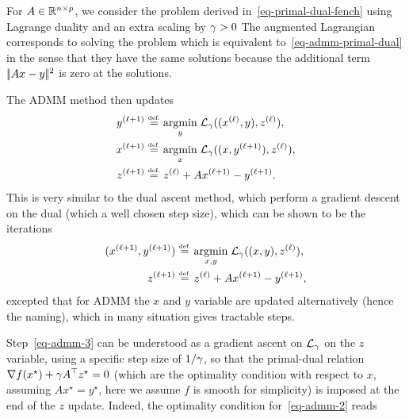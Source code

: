 For $A \in \mathbb{R}^{n \times p}$, we consider the problem derived in~\eqref{eq-primal-dual-fench} using Lagrange duality and an extra scaling by $\gamma>0$ 
The augmented Lagrangian corresponds to solving the problem
which is equivalent to~\eqref{eq-admm-primal-dual} in the sense that they have the same solutions because the additional term $|\!| Ax-y |\!|^2$ is zero at the solutions.

The ADMM method then updates
\begin{align}
	\label{eq-admm-1}y^{(\ell+1)} &\stackrel{\mbox{\upshape\tiny def.}}{=} \underset{y}{\operatorname{argmin}}\; \mathcal{L}_\gamma( (x^{(\ell)},y),z^{(\ell)}  ), \\
	\label{eq-admm-2}x^{(\ell+1)} &\stackrel{\mbox{\upshape\tiny def.}}{=} \underset{x}{\operatorname{argmin}}\; \mathcal{L}_\gamma( (x,y^{(\ell+1)}),z^{(\ell)}  ), \\
	\label{eq-admm-3}z^{(\ell+1)} &\stackrel{\mbox{\upshape\tiny def.}}{=} z^{(\ell)} + A x^{(\ell+1)}-y^{(\ell+1)}. 
\end{align}
This is very similar to the dual ascent method, which perform a gradient descent on the dual (which a well chosen step size), which can be shown to be the iterations
\begin{align*}
	(x^{(\ell+1)},y^{(\ell+1)}) &\stackrel{\mbox{\upshape\tiny def.}}{=} \underset{x,y}{\operatorname{argmin}}\; \mathcal{L}_\gamma( (x,y),z^{(\ell)}  ), \\
	z^{(\ell+1)} &\stackrel{\mbox{\upshape\tiny def.}}{=} z^{(\ell)} + A x^{(\ell+1)}-y^{(\ell+1)}, 
\end{align*}
excepted that for ADMM the $x$ and $y$ variable are updated alternatively (hence the naming), which in many situation gives tractable steps. 

Step~\eqref{eq-admm-3} can be understood as a gradient ascent on $\mathcal{L}_\gamma$ on the $z$ variable, using a specific step size of $1/\gamma$, so that the primal-dual relation $\nabla f(x^\star) + \gamma A^\top z^\star=0$ (which are the optimality condition with respect to $x$, assuming $A x^\star=y^\star$, here we assume $f$ is smooth for simplicity) is imposed at the end of the $z$ update. Indeed, the optimality condition for~\eqref{eq-admm-2} reads

